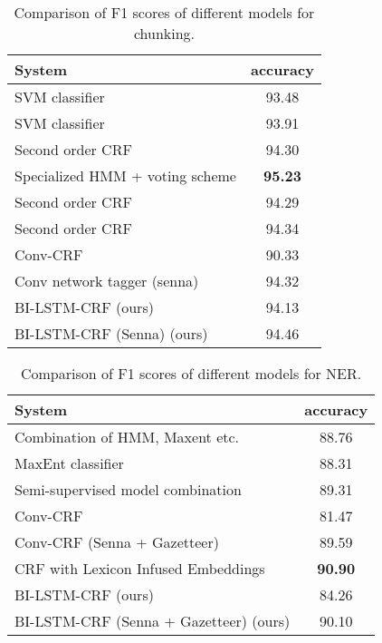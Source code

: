 \documentclass[11pt,a4paper]{article}
\begin{document}
\begin{table*}[!hbt]
\begin{center} 
\caption{Comparison of F1 scores of different models for chunking.}
\label{tab:chunk}
\begin{tabular}{l|c}
\hline
System & accuracy  \\ \hline
SVM classifier \cite{kudo1} & 93.48  \\
SVM classifier \cite{kudo2} & 93.91  \\
Second order CRF \cite{sha1} & 94.30  \\
Specialized HMM + voting scheme \cite{shen2} & \textbf{95.23} \\
Second order CRF \cite{mcdonald1} & 94.29 \\ 
Second order CRF \cite{sun2} & 94.34 \\ 
Conv-CRF \cite{collobert1} & 90.33  \\
Conv network tagger (senna) \cite{collobert1} & 94.32 \\ \hline
BI-LSTM-CRF (ours) & 94.13  \\
BI-LSTM-CRF (Senna) (ours) &  94.46\\\hline
\end{tabular}
\end{center}
\end{table*}

\begin{table*}[!hbt]
\begin{center} 
\caption{Comparison of F1 scores of different models for NER.}
\label{tab:ner}
\begin{tabular}{l|c}
\hline
System & accuracy  \\ \hline
Combination of HMM, Maxent etc. \cite{florian1} & 88.76  \\
MaxEnt classifier \cite{chieu1} & 88.31  \\
Semi-supervised model combination \cite{ando1} & 89.31 \\
Conv-CRF \cite{collobert1} & 81.47  \\
Conv-CRF (Senna + Gazetteer) \cite{collobert1} & 89.59 \\ 
CRF with Lexicon Infused Embeddings \cite{passos1} & \textbf{90.90} \\ \hline
BI-LSTM-CRF (ours) & 84.26  \\
BI-LSTM-CRF (Senna + Gazetteer) (ours) &  90.10\\\hline
\end{tabular}
\end{center}
\end{table*}
\end{document}
